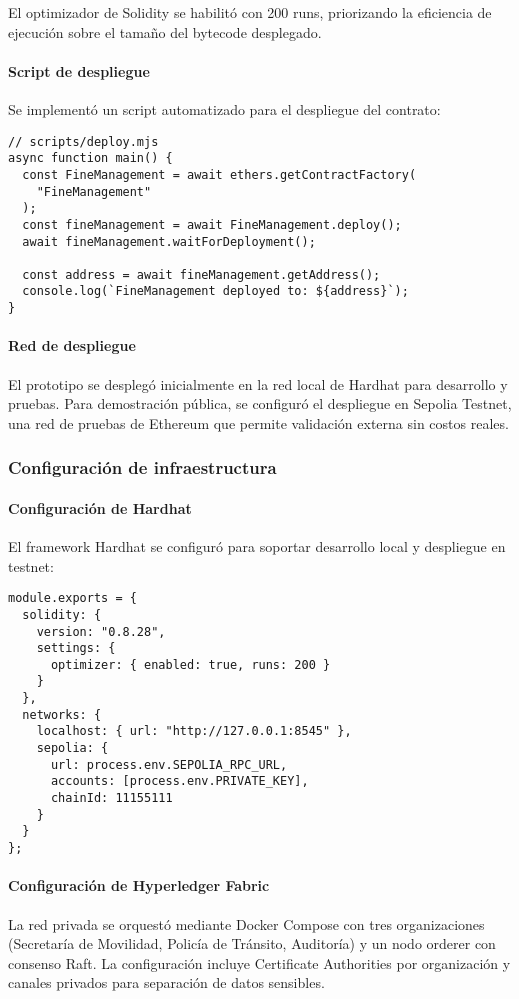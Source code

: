 El optimizador de Solidity se habilitó con 200 runs, priorizando la eficiencia de ejecución sobre el tamaño del bytecode desplegado.

\paragraph{Script de despliegue}
Se implementó un script automatizado para el despliegue del contrato:

\begin{verbatim}
// scripts/deploy.mjs
async function main() {
  const FineManagement = await ethers.getContractFactory(
    "FineManagement"
  );
  const fineManagement = await FineManagement.deploy();
  await fineManagement.waitForDeployment();
  
  const address = await fineManagement.getAddress();
  console.log(`FineManagement deployed to: ${address}`);
}
\end{verbatim}

\paragraph{Red de despliegue}
El prototipo se desplegó inicialmente en la red local de Hardhat para desarrollo y pruebas. Para demostración pública, se configuró el despliegue en Sepolia Testnet, una red de pruebas de Ethereum que permite validación externa sin costos reales.

\subsubsection{Configuración de infraestructura}

\paragraph{Configuración de Hardhat}
El framework Hardhat se configuró para soportar desarrollo local y despliegue en testnet:

\begin{verbatim}
module.exports = {
  solidity: {
    version: "0.8.28",
    settings: {
      optimizer: { enabled: true, runs: 200 }
    }
  },
  networks: {
    localhost: { url: "http://127.0.0.1:8545" },
    sepolia: {
      url: process.env.SEPOLIA_RPC_URL,
      accounts: [process.env.PRIVATE_KEY],
      chainId: 11155111
    }
  }
};
\end{verbatim}

\paragraph{Configuración de Hyperledger Fabric}
La red privada se orquestó mediante Docker Compose con tres organizaciones (Secretaría de Movilidad, Policía de Tránsito, Auditoría) y un nodo orderer con consenso Raft. La configuración incluye Certificate Authorities por organización y canales privados para separación de datos sensibles.

